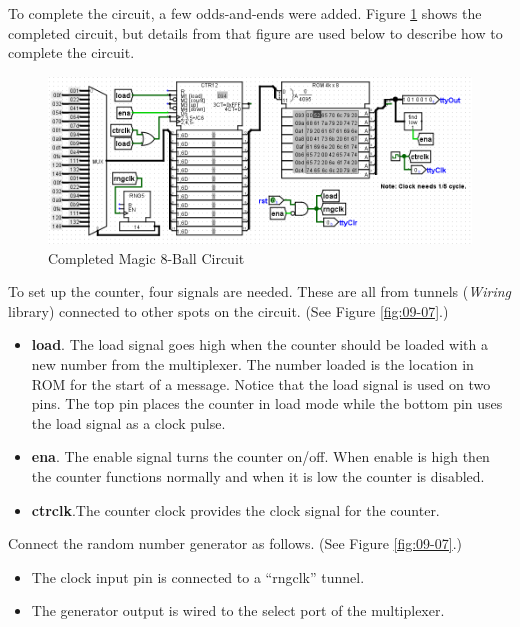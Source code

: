 To complete the circuit, a few odds-and-ends were added. Figure \ref{fig:09-06} shows the completed circuit, but details from that figure are used below to describe how to complete the circuit.

\begin{figure}[H]
	\centering
	\includegraphics[width=\maxwidth{.95\linewidth}]{gfx/09-06}
	\caption{Completed Magic 8-Ball Circuit}
	\label{fig:09-06}
\end{figure}

To set up the counter, four signals are needed. These are all from tunnels (\textit{Wiring} library) connected to other spots on the circuit. (See Figure \ref{fig:09-07}.)

\begin{itemize}
	\item \textbf{load}. The load signal goes high when the counter should be loaded with a new number from the multiplexer. The number loaded is the location in ROM for the start of a message. Notice that the load signal is used on two pins. The top pin places the counter in load mode while the bottom pin uses the load signal as a clock pulse.
	\item \textbf{ena}. The enable signal turns the counter on/off. When enable is high then the counter functions normally and when it is low the counter is disabled.
	\item \textbf{ctrclk}.The counter clock provides the clock signal for the counter.
\end{itemize}

Connect the random number generator as follows. (See Figure \ref{fig:09-07}.)

\begin{itemize}
	\item The clock input pin is connected to a ``rngclk'' tunnel.
	\item The generator output is wired to the select port of the multiplexer.
\end{itemize}

